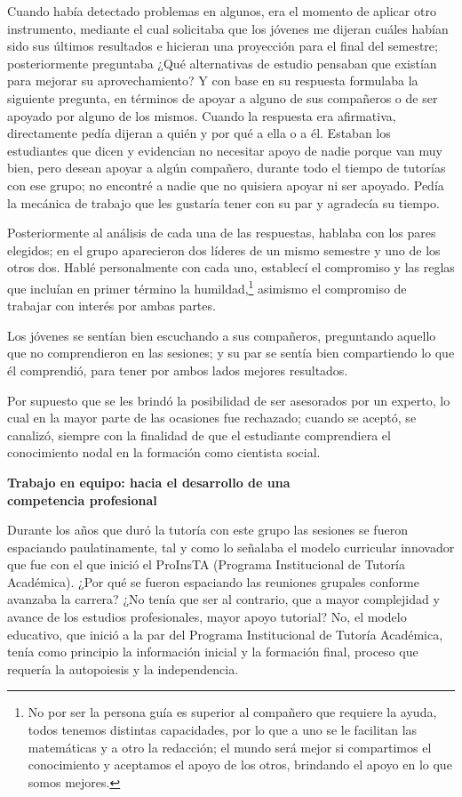 Cuando había detectado problemas en algunos, era el momento de aplicar otro
instrumento, mediante el cual solicitaba que los jóvenes me dijeran cuáles
habían sido sus últimos resultados e hicieran una proyección para el final
del semestre;  posteriormente preguntaba ¿Qué alternativas de estudio
pensaban que existían para mejorar su aprovechamiento? Y con base en su
respuesta formulaba la siguiente pregunta, en términos de apoyar a alguno
de sus compañeros o de ser apoyado por alguno de los mismos. Cuando la
respuesta era afirmativa, directamente pedía dijeran a quién y por qué a
ella o a él. Estaban los estudiantes que dicen y evidencian no necesitar
apoyo de nadie  porque van muy bien, pero desean apoyar a algún compañero,
durante todo el tiempo de tutorías con ese grupo; no encontré a nadie que
no quisiera apoyar ni ser apoyado. Pedía la mecánica de trabajo que les
gustaría tener con su par y agradecía su tiempo.


Posteriormente al análisis de cada una de las respuestas, hablaba con los
pares elegidos; en el grupo aparecieron dos líderes de un mismo semestre y
uno de los otros dos. Hablé personalmente con cada uno, establecí el
compromiso y las reglas que incluían en primer término la
humildad,\footnote{No por ser la persona guía es superior al compañero que
requiere la ayuda, todos tenemos distintas capacidades, por lo que a uno se
le facilitan las matemáticas y a otro la redacción; el mundo será mejor si
compartimos el conocimiento y aceptamos el apoyo de los otros, brindando el
apoyo en lo que somos mejores.} asimismo el compromiso de trabajar con
interés por ambas partes.


Los jóvenes se sentían bien escuchando a sus compañeros, preguntando aquello
que no comprendieron en las sesiones; y su par se sentía bien compartiendo
lo que él comprendió, para tener por ambos lados mejores resultados.


Por supuesto que se les brindó la posibilidad de ser asesorados por un
experto, lo cual en la mayor parte de las ocasiones fue rechazado; cuando
se aceptó, se canalizó, siempre con la finalidad de que el estudiante
comprendiera el conocimiento nodal en la formación como cientista social.
\newpage

\textbf{Trabajo en equipo: hacia el desarrollo de una\\ competencia
profesional}


Durante los años que duró la tutoría con este grupo las sesiones se fueron
espaciando paulatinamente, tal y como lo señalaba el modelo curricular
innovador que fue con el que inició el ProInsTA (Programa Institucional de
Tutoría Académica). ¿Por qué se fueron espaciando las reuniones grupales
conforme avanzaba la carrera? ¿No tenía que ser al contrario, que a mayor
complejidad y avance de los estudios profesionales, mayor apoyo tutorial?
No, el modelo educativo, que inició a la par del Programa Institucional de
Tutoría Académica, tenía como principio la información inicial y la
formación final, proceso que requería la autopoiesis y la independencia.


